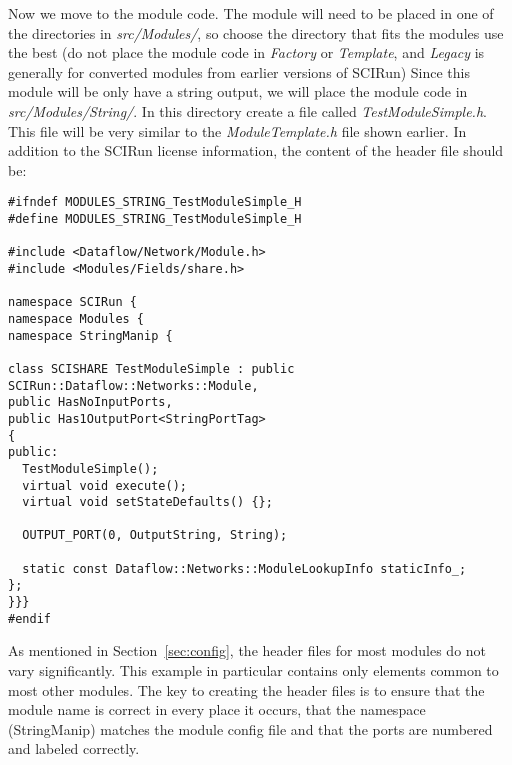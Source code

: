 \documentclass[fleqn,11pt,openany]{book}
\begin{document}
Now we move to the module code.
The module will need to be placed in one of the directories in \emph{src/Modules/}, so choose the directory that fits the modules use the best (do not place the module code in \emph{Factory} or \emph{Template}, and \emph{Legacy} is generally for converted modules from earlier versions of SCIRun)
Since this module will be only have a string output, we will place the module code in \emph{src/Modules/String/}.
In this directory create a file called \emph{TestModuleSimple.h}.  
This file will be very similar to the \emph{ModuleTemplate.h} file shown earlier.
In addition to the SCIRun license information, the content of the header file should be:
\begin{verbatim}
#ifndef MODULES_STRING_TestModuleSimple_H
#define MODULES_STRING_TestModuleSimple_H

#include <Dataflow/Network/Module.h>
#include <Modules/Fields/share.h>

namespace SCIRun {
namespace Modules {
namespace StringManip {

class SCISHARE TestModuleSimple : public SCIRun::Dataflow::Networks::Module,
public HasNoInputPorts,
public Has1OutputPort<StringPortTag>
{
public:
  TestModuleSimple();
  virtual void execute();
  virtual void setStateDefaults() {};
  
  OUTPUT_PORT(0, OutputString, String);
  
  static const Dataflow::Networks::ModuleLookupInfo staticInfo_;
};
}}}
#endif
\end{verbatim}
As mentioned in Section~\ref{sec:config}, the header files for most modules do not vary significantly.  
This example in particular contains only elements common to most other modules.
The key to creating the header files is to ensure that the module name is correct in every place it occurs, that the namespace (StringManip) matches the module config file and that the ports are numbered and labeled correctly.  
\end{document}
